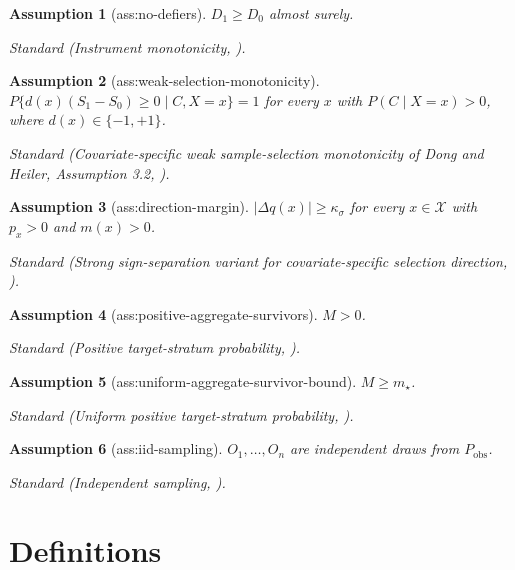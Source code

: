 \documentclass{article}
\newtheorem{assumption}{Assumption}
\begin{document}
\begin{assumption}[ass:no-defiers]\label{ass:no-defiers}
\(D_1\ge D_0\) almost surely.
\par\smallskip\noindent\emph{Standard} (Instrument monotonicity, \cite{AngristImbensRubin1996}).
\end{assumption}

\begin{assumption}[ass:weak-selection-monotonicity]\label{ass:weak-selection-monotonicity}
\(P\{d(x)(S_1-S_0)\ge0\mid C,X=x\}=1\) for every \(x\) with \(P(C\mid X=x)>0\), where \(d(x)\in\{-1,+1\}\).
\par\smallskip\noindent\emph{Standard} (Covariate-specific weak sample-selection monotonicity of Dong and Heiler, Assumption 3.2, \cite{DongHeiler2026}).
\end{assumption}

\begin{assumption}[ass:direction-margin]\label{ass:direction-margin}
\(|\Delta q(x)|\ge\kappa_{\sigma}\) for every \(x\in\mathcal X\) with \(p_x>0\) and \(m(x)>0\).
\par\smallskip\noindent\emph{Standard} (Strong sign-separation variant for covariate-specific selection direction, \cite{Semenova2025}).
\end{assumption}

\begin{assumption}[ass:positive-aggregate-survivors]\label{ass:positive-aggregate-survivors}
\(M>0\).
\par\smallskip\noindent\emph{Standard} (Positive target-stratum probability, \cite{KennedyHarrisKeele2019}).
\end{assumption}

\begin{assumption}[ass:uniform-aggregate-survivor-bound]\label{ass:uniform-aggregate-survivor-bound}
\(M\ge m_{\star}\).
\par\smallskip\noindent\emph{Standard} (Uniform positive target-stratum probability, \cite{KennedyHarrisKeele2019}).
\end{assumption}

\begin{assumption}[ass:iid-sampling]\label{ass:iid-sampling}
\(O_1,\ldots,O_n\) are independent draws from \(P_{\mathrm{obs}}\).
\par\smallskip\noindent\emph{Standard} (Independent sampling, \cite{vanDerVaart1998}).
\end{assumption}

\section{Definitions}
\end{document}
